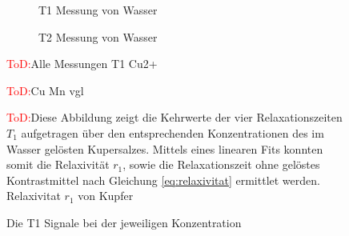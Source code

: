 
 


\begin{figure}[H]
    \begin{subfigure}[b]{0.5\textwidth}
        \centering
        \resizebox{1\textwidth}{!}{}
        \caption{T1 Messung von Wasser}
    \end{subfigure}
    \begin{subfigure}[b]{0.5\textwidth}
        \centering
        \resizebox{1\textwidth}{!}{}
        \caption{T2 Messung von Wasser}
    \end{subfigure}
    \caption{}
    \label{}
\end{figure}



\begin{figure}[H]
    \centering
    
    \caption{\textcolor{red}{ToD:}Alle Messungen T1 Cu2+}
    \label{fig:T1CU}
\end{figure}

\begin{figure}[H]
    \centering
    
    \caption{\textcolor{red}{ToD:}Cu Mn vgl}
    \label{fig:T1CuMn}
\end{figure}



\begin{figure}[H]
    \centering
    
    \caption[]{\textcolor{red}{ToD:}Diese Abbildung zeigt die Kehrwerte der vier Relaxationszeiten $T_1$ aufgetragen über den entsprechenden Konzentrationen des im Wasser gelösten Kupersalzes. Mittels eines linearen Fits konnten somit die Relaxivität $r_1$, sowie die Relaxationszeit ohne gelöstes Kontrastmittel nach Gleichung \eqref{eq:relaxivitat} ermittlet werden.
    Relaxivitat $r_1$ von Kupfer}
    \label{fig:RelaxCUT1}
\end{figure}


\begin{figure}[H]
    \centering
    
    \caption{Die T1 Signale bei der jeweiligen Konzentration}
    \label{fig:T1Signalkontrast}
\end{figure}


